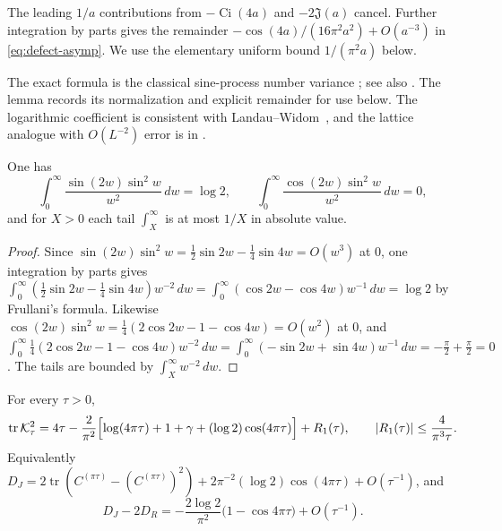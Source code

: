 \begin{remark}\label{rem:defect-remainder}
The leading $1/a$ contributions from $-\operatorname{Ci}(4a)$ and $-2\mathfrak J(a)$
cancel.  Further integration by parts gives the remainder
$-\cos(4a)/(16\pi^2a^2)+O(a^{-3})$ in \eqref{eq:defect-asymp}.
We use the elementary uniform bound $1/(\pi^2a)$ below.
\end{remark}

The exact formula is the classical sine-process number variance
\cite{DysonMehta1963,Mehta2004}; see also
\cite[Theorem~4.3]{Azimifard2026a}. The lemma records its normalization
and explicit remainder for use below. The logarithmic coefficient is
consistent with Landau--Widom~\cite{LandauWidom1980}, and the lattice
analogue with $O(L^{-2})$ error is in
\cite[eq.~(D.6)]{AbanovIvanovQian2011}.

\begin{lemma}\label{lem:two-integrals}
One has
\[
 \int_0^\infty\frac{\sin(2w)\sin^2w}{w^2}\,dw=\log2,
 \qquad
 \int_0^\infty\frac{\cos(2w)\sin^2w}{w^2}\,dw=0,
\]
and for $X>0$ each tail $\int_X^\infty$ is at most $1/X$ in absolute value.
\end{lemma}

\begin{proof}
Since $\sin(2w)\sin^2w=\tfrac12\sin2w-\tfrac14\sin4w=O(w^3)$ at $0$, one
integration by parts gives
$\int_0^\infty(\tfrac12\sin2w-\tfrac14\sin4w)w^{-2}\,dw
=\int_0^\infty(\cos2w-\cos4w)w^{-1}\,dw=\log2$ by Frullani's formula.
Likewise $\cos(2w)\sin^2w=\tfrac14(2\cos2w-1-\cos4w)=O(w^2)$ at $0$, and
$\int_0^\infty\tfrac14(2\cos2w-1-\cos4w)w^{-2}\,dw
=\int_0^\infty(-\sin2w+\sin4w)w^{-1}\,dw=-\tfrac\pi2+\tfrac\pi2=0$.
The tails are bounded by $\int_X^\infty w^{-2}\,dw$.
\end{proof}

\begin{theorem}\label{thm:hs-exact}
For every $\tau>0$,
\begin{equation}\label{eq:hs-exact}
 \operatorname{tr}\mathcal K_\tau^2
 =4\tau-\frac{2}{\pi^2}\Bigl[\log(4\pi\tau)+1+\gamma+(\log2)\cos(4\pi\tau)\Bigr]
 +R_1(\tau),\qquad |R_1(\tau)|\le\frac{4}{\pi^3\tau}.
\end{equation}
Equivalently $D_J=2\operatorname{tr}(C^{(\pi\tau)}-(C^{(\pi\tau)})^2)
+2\pi^{-2}(\log2)\cos(4\pi\tau)+O(\tau^{-1})$, and
\begin{equation}\label{eq:DJ-DR}
 D_J-2D_R=-\frac{2\log2}{\pi^2}\bigl(1-\cos4\pi\tau\bigr)+O(\tau^{-1}).
\end{equation}
\end{theorem}

